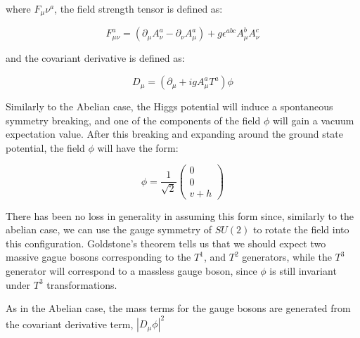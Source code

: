 \noindent where $F_{\mu}{\nu}^{a}$, the field strength tensor is
defined as:

\begin{equation}\label{eq:non_abelian_higgs_mechanism_field_strength_tensor}
F_{\mu\nu}^{a} = (\partial_{\mu}A_{\nu}^{a}
- \partial_{\nu}A_{\mu}^{a}) + g\epsilon^{abc}A_{\mu}^{b}A_{\nu}^{c}
\end{equation}

\noindent and the covariant derivative is defined as:

\begin{equation}\label{eq:non_abelian_higgs_mechanism_covariant_derivative}
D_{\mu} = (\partial_{\mu} + igA_{\mu}^{a}T^{a})\phi
\end{equation}

\par Similarly to the Abelian case, the Higgs potential will induce a
spontaneous symmetry breaking, and one of the components of the field
$\phi$ will gain a vacuum expectation value.  After this breaking and
expanding around the ground state potential, the
field $\phi$ will have the form:

\begin{equation}\label{eq:non_abelian_higgs_mechanism_phi_broken}
\phi = \frac{1}{\sqrt{2}}
  \begin{pmatrix}
    0 \\
    0 \\
    v + h
    \end{pmatrix}
\end{equation}

\noindent There has been no loss in generality in assuming this form
since, similarly to the abelian case, we can use the gauge symmetry of
$SU(2)$ to rotate the field into this configuration.  Goldstone's
theorem tells us that we should expect two massive gague bosons
corresponding to the $T^{1}$, and $T^{2}$ generators, while the
$T^{3}$ generator will correspond to a massless gauge boson, since
$\phi$ is still invariant under $T^{3}$ transformations. 

\par As in the Abelian case, the mass terms for the gauge bosons are
generated from the covariant derivative term, $|D_{\mu}\phi|^{2}$

